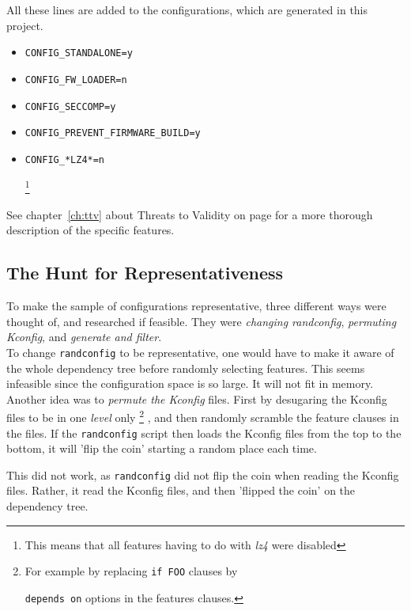 \documentclass[a4paper,11pt]{report}
\newcommand{\textcode}[1]{
    \fboxsep=1pt
    \texttt{\colorbox{gray!20}{#1}}
}
\begin{document}
All these lines are added to the configurations, which are generated in
this project.

\begin{itemize}
    \item \textcode{CONFIG\_STANDALONE=y}
    \item \textcode{CONFIG\_FW\_LOADER=n}
    \item \textcode{CONFIG\_SECCOMP=y}
    \item \textcode{CONFIG\_PREVENT\_FIRMWARE\_BUILD=y}
    \item \textcode{CONFIG\_*LZ4*=n}
        \footnote{This means that all features having to do with \emph{lz4} 
                    were disabled}
\end{itemize}

See chapter~\ref{ch:ttv} about Threats to Validity on page \pageref{ch:ttv} 
for a more thorough description of the specific features.


    \subsection{The Hunt for Representativeness}
    \label{rephunt}
To make the sample of configurations representative, three different ways were
thought of, and researched if feasible. They were \emph{changing randconfig}, 
\emph{permuting Kconfig}, and \emph{generate and filter}.
\\

To change \texttt{randconfig} to be representative, one would have to make 
it aware of the whole dependency tree before randomly selecting features. This 
seems infeasible since the configuration space is so large. It will not fit in 
memory.
\\

Another idea was to \emph{permute the Kconfig} files. First by desugaring the 
Kconfig files to be in one \emph{level} only
    \footnote{For example by replacing \textcode{if FOO} clauses by 
    \textcode{depends on} options in the features clauses.}
, and then randomly scramble the feature 
clauses in the files. If the \texttt{randconfig} script then loads the Kconfig
files from the top to the bottom, it will 'flip the coin' starting a random 
place each time.

This did not work, as \texttt{randconfig} did not flip the coin when reading 
the Kconfig files. Rather, it read the Kconfig files, and then 'flipped the 
coin' on the dependency tree.
\\
\end{document}
